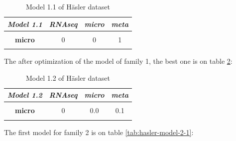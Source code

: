 \documentclass[
  12pt,
  a4paper,
  twoside,
  openright]{book}
\begin{document}
\begin{table}[H]

\caption[Model 1.1 of Häsler dataset]{\label{tab:hasler-model-1-1}Model 1.1 of Häsler dataset}
\centering
\begin{tabular}[t]{|>{}c|c|c|>{}c|}
\hline
\em{\textbf{Model 1.1}} & \em{\textbf{RNAseq}} & \em{\textbf{micro}} & \em{\textbf{meta}}\\
\hline
\textbf{\cellcolor{gray!6}{RNAseq}} & \cellcolor{gray!6}{0} & \cellcolor{gray!6}{0} & \cellcolor{gray!6}{1}\\
\hline
\textbf{micro} & 0 & 0 & 1\\
\hline
\textbf{\cellcolor{gray!6}{meta}} & \cellcolor{gray!6}{1} & \cellcolor{gray!6}{1} & \cellcolor{gray!6}{0}\\
\hline
\end{tabular}
\end{table}

The after optimization of the model of family 1, the best one is on table \ref{tab:hasler-model-1-2}:

\begin{table}[H]

\caption[Model 1.2 of Häsler dataset]{\label{tab:hasler-model-1-2}Model 1.2 of Häsler dataset}
\centering
\begin{tabular}[t]{|>{}c|c|c|>{}c|}
\hline
\em{\textbf{Model 1.2}} & \em{\textbf{RNAseq}} & \em{\textbf{micro}} & \em{\textbf{meta}}\\
\hline
\textbf{\cellcolor{gray!6}{RNAseq}} & \cellcolor{gray!6}{0} & \cellcolor{gray!6}{0.0} & \cellcolor{gray!6}{1.0}\\
\hline
\textbf{micro} & 0 & 0.0 & 0.1\\
\hline
\textbf{\cellcolor{gray!6}{meta}} & \cellcolor{gray!6}{1} & \cellcolor{gray!6}{0.1} & \cellcolor{gray!6}{0.0}\\
\hline
\end{tabular}
\end{table}

The first model for family 2 is on table \ref{tab:hasler-model-2-1}:
\end{document}
